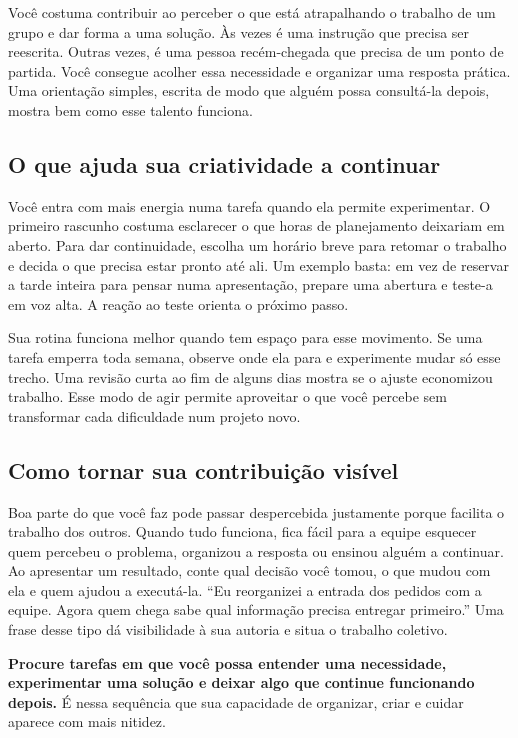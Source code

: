 \documentclass[11pt,a4paper]{article}
\begin{document}
Você costuma contribuir ao perceber o que está atrapalhando o trabalho de um grupo e dar forma a uma solução. Às vezes é uma instrução que precisa ser reescrita. Outras vezes, é uma pessoa recém-chegada que precisa de um ponto de partida. Você consegue acolher essa necessidade e organizar uma resposta prática. Uma orientação simples, escrita de modo que alguém possa consultá-la depois, mostra bem como esse talento funciona.

\subsection*{O que ajuda sua criatividade a continuar}

Você entra com mais energia numa tarefa quando ela permite experimentar. O primeiro rascunho costuma esclarecer o que horas de planejamento deixariam em aberto. Para dar continuidade, escolha um horário breve para retomar o trabalho e decida o que precisa estar pronto até ali. Um exemplo basta: em vez de reservar a tarde inteira para pensar numa apresentação, prepare uma abertura e teste-a em voz alta. A reação ao teste orienta o próximo passo.

Sua rotina funciona melhor quando tem espaço para esse movimento. Se uma tarefa emperra toda semana, observe onde ela para e experimente mudar só esse trecho. Uma revisão curta ao fim de alguns dias mostra se o ajuste economizou trabalho. Esse modo de agir permite aproveitar o que você percebe sem transformar cada dificuldade num projeto novo.

\subsection*{Como tornar sua contribuição visível}

Boa parte do que você faz pode passar despercebida justamente porque facilita o trabalho dos outros. Quando tudo funciona, fica fácil para a equipe esquecer quem percebeu o problema, organizou a resposta ou ensinou alguém a continuar. Ao apresentar um resultado, conte qual decisão você tomou, o que mudou com ela e quem ajudou a executá-la. “Eu reorganizei a entrada dos pedidos com a equipe. Agora quem chega sabe qual informação precisa entregar primeiro.” Uma frase desse tipo dá visibilidade à sua autoria e situa o trabalho coletivo.

\textbf{Procure tarefas em que você possa entender uma necessidade, experimentar uma solução e deixar algo que continue funcionando depois.} É nessa sequência que sua capacidade de organizar, criar e cuidar aparece com mais nitidez.
\end{document}
